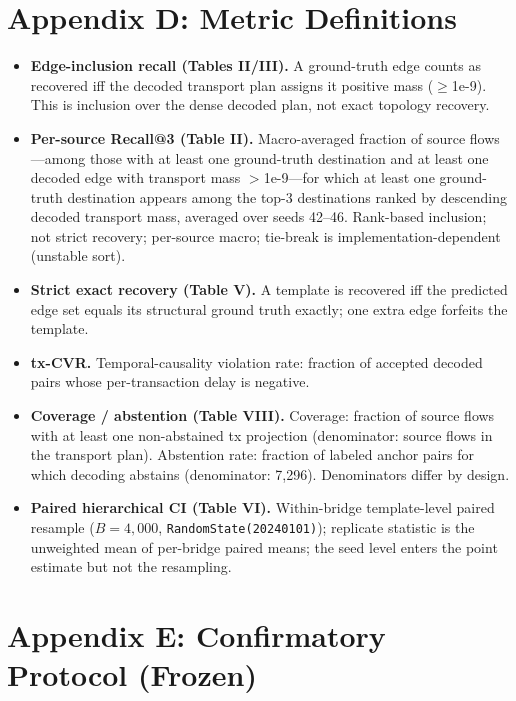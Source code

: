 \documentclass[journal]{IEEEtran}
\begin{document}
\section*{Appendix D: Metric Definitions}

\begin{itemize}
\item \textbf{Edge-inclusion recall (Tables II/III).} A ground-truth edge counts as recovered iff the decoded transport plan assigns it positive mass ($\ge$1e-9). This is inclusion over the dense decoded plan, not exact topology recovery.
\item \textbf{Per-source Recall@3 (Table II).} Macro-averaged fraction of source flows---among those with at least one ground-truth destination and at least one decoded edge with transport mass $>$1e-9---for which at least one ground-truth destination appears among the top-3 destinations ranked by descending decoded transport mass, averaged over seeds 42--46. Rank-based inclusion; not strict recovery; per-source macro; tie-break is implementation-dependent (unstable sort).
\item \textbf{Strict exact recovery (Table V).} A template is recovered iff the predicted edge set equals its structural ground truth exactly; one extra edge forfeits the template.
\item \textbf{tx-CVR.} Temporal-causality violation rate: fraction of accepted decoded pairs whose per-transaction delay is negative.
\item \textbf{Coverage / abstention (Table VIII).} Coverage: fraction of source flows with at least one non-abstained tx projection (denominator: source flows in the transport plan). Abstention rate: fraction of labeled anchor pairs for which decoding abstains (denominator: 7{,}296). Denominators differ by design.
\item \textbf{Paired hierarchical CI (Table VI).} Within-bridge template-level paired resample ($B=4{,}000$, \texttt{RandomState(20240101)}); replicate statistic is the unweighted mean of per-bridge paired means; the seed level enters the point estimate but not the resampling.
\end{itemize}

\section*{Appendix E: Confirmatory Protocol (Frozen)}
\end{document}
